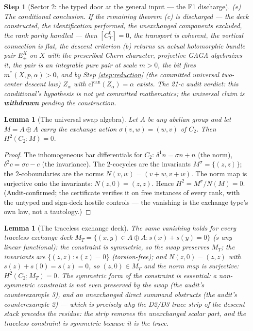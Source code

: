 \documentclass[11pt]{article}
\newtheorem{lemma}[theorem]{Lemma}
\newtheorem{step}{Step}
\begin{document}
\begin{step}[Sector 2: the typed door at the general input --- the F1
discharge]
\emph{(e) The conditional conclusion.} \emph{If} the remaining theorem
(c) is discharged --- the deck constructed, the identification performed,
the unexchanged components excluded, the rank parity handled --- then
$[C_T^0] = 0$, the transport is coherent, the vertical connection is flat,
the descent criterion (b) returns an actual holomorphic bundle pair
$E_\pm^X$ on $X$ with the prescribed Chern character, projective GAGA
algebraizes it, the pair is an integrable pure pair at scale $m > 0$, the
bit fires $m^*(X,p,\alpha) > 0$, and by Step \ref{step:reduction} (the
committed universal two-center descent law) $Z_\alpha$ with
$\mathrm{cl}^{\mathrm{can}}(Z_\alpha) = \alpha$ exists. The 21-c audit
verdict: this conditional's hypothesis is \emph{not} yet committed
mathematics; the universal claim is \textbf{withdrawn} pending the
construction.
\end{step}

\begin{lemma}[The universal swap algebra]\label{lem:swap}
Let $A$ be any abelian group and let $M = A \oplus A$ carry the exchange
action $\sigma(v,w) = (w,v)$ of $C_2$. Then $H^2(C_2; M) = 0$.
\end{lemma}

\begin{proof}
The inhomogeneous bar differentials for $C_2$:
$\delta^1 n = \sigma n + n$ (the norm), $\delta^2 c = \sigma c - c$ (the
invariance). The $2$-cocycles are the invariants $M^\sigma = \{(z,z)\}$;
the $2$-coboundaries are the norms $N(v,w) = (v+w, v+w)$. The norm map is
surjective onto the invariants: $N(z, 0) = (z, z)$. Hence
$H^2 = M^\sigma / N(M) = 0$. (Audit-confirmed; the certificate verifies it
on free instances of every rank, with the untyped and sign-deck hostile
controls --- the vanishing is the exchange type's own law, not a tautology.)
\end{proof}

\begin{lemma}[The traceless exchange deck]\label{lem:traceless}
The same vanishing holds for every traceless exchange deck
$M_T = \{(x,y) \in A \oplus A : s(x) + s(y) = 0\}$ ($s$ any linear
functional): the constraint is symmetric, so the swap preserves $M_T$; the
invariants are $\{(z,z) : s(z) = 0\}$ (torsion-free); and
$N(z,0) = (z,z)$ with $s(z) + s(0) = s(z) = 0$, so $(z,0) \in M_T$ and the
norm map is surjective: $H^2(C_2; M_T) = 0$. \emph{The symmetric form of
the constraint is essential}: a non-symmetric constraint is not even
preserved by the swap (the audit's counterexample 3), and an unexchanged
direct summand obstructs (the audit's counterexample 2) --- which is
precisely why the D2/D3 trace strip of the descent stack precedes the
residue: the strip removes the unexchanged scalar part, and the traceless
constraint is symmetric because it is the trace.
\end{lemma}
\end{document}
